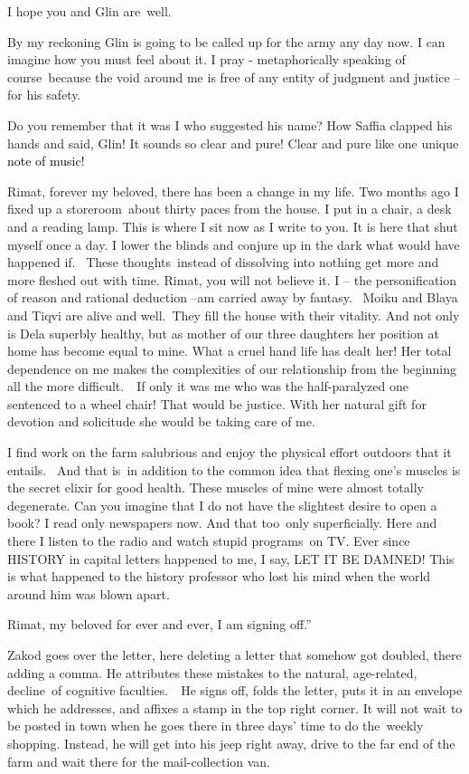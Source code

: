 \documentclass[letterpaper]{article}
\begin{document}
I hope you and Glin are~well.

By my reckoning Glin is going to be called up for the army any day now. I can imagine how you must feel about it. I pray
- metaphorically speaking of course~because the void around me is free of any entity of judgment and justice -- for his
safety.

Do you remember that it was I who suggested his name? How Saffia clapped his hands and said, {\textquotedbl}Glin! It
sounds so clear and pure! Clear and pure like one unique \textcolor{black}{note of music}!{\textquotedbl}

Rimat, forever my beloved, there has been a change in my life. Two months ago I fixed up a storeroom~about thirty paces
from the house. I put in a chair, a desk and a reading lamp. This is where I sit now as I write to you. It is here that
shut myself once a day. I lower the blinds and conjure up in the dark what would have happened
{\textquotedbl}if{\textquotedbl}.~ These thoughts~instead of dissolving into nothing get more and more fleshed out with
time. Rimat, you will not believe it. I -- the personification of reason and rational deduction --am carried away by
fantasy.~ Moiku and Blaya and Tiqvi are alive and well.\ They fill the house with their vitality. And not only is Dela
superbly healthy, but as mother of our three daughters her position at home has become equal to mine. What a cruel hand
life has dealt her! Her total dependence on me makes the complexities of our relationship from the beginning all the
more difficult.\ \ If only it was me who was the half-paralyzed one sentenced to a wheel chair! That would be justice.
With her natural gift for devotion and solicitude she would be taking care of me.~ 

I find work on the farm salubrious and enjoy the physical effort outdoors that it entails.~ And that is~in addition to
the common idea that flexing one's muscles is the secret elixir for good health. These muscles of mine were almost
totally degenerate. Can you imagine that I do not have the slightest desire to open a book? I read only newspapers now.
And that too\ only superficially. Here and there I listen to the radio and watch stupid programs~on TV. Ever since
HISTORY in capital letters happened to me, I say, LET IT BE DAMNED! This is what happened to the history professor who
lost his mind when the world around him was blown apart.

Rimat, my beloved for ever and ever, I am signing off.{}''

Zakod goes over the letter, here deleting a letter that somehow got doubled, there adding a comma. He attributes these
mistakes to the natural, age-related, decline~of cognitive faculties.\ \ He signs off, folds the letter, puts it in an
envelope which he addresses, and affixes a stamp in the top right corner. It will not wait to be posted in town when he
goes there in three days' time to do the~weekly shopping. Instead, he will get into his jeep right away, drive to the
far end of the farm and wait there for the mail-collection van.
\end{document}
